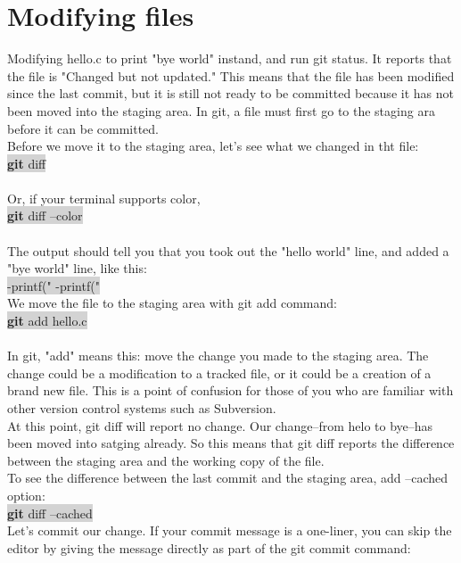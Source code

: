 \documentclass{article}
\begin{document}
 \section{\textbf{Modifying files}}
 Modifying hello.c to print "bye world" instand, and run git status. It reports that the file is "Changed but not updated." This means that the file has been modified since the last commit, but it is still not ready to be committed because it has not been moved into the staging area.
 In git, a file must first go to the staging ara before it can be committed.\\
 Before we move it to the staging area, let's see what we changed in tht file:\\
 \colorbox{lightgray}{
	 \textbf{git} diff\\
 }\\
 Or, if your terminal supports color,\\
 \colorbox{lightgray}{
	 \textbf{git} diff --color\\
 }\\
 The output should tell you that you took out the "hello world" line, and added a "bye world" line, like this:\\
 \colorbox{lightgray}{
	 -printf("%
	 -printf("%
 }\\
 We move the file to the staging area with git add command:\\
 \colorbox{lightgray}{
	 \textbf{git} add hello.c\\
 }\\
 In git, "add" means this: move the change you made to the staging area. The change could be a modification to a tracked file, or it could be a creation of a brand new file. This is a point of confusion for those of you who are familiar with other version control systems such as Subversion.\\
 At this point, git diff will report no change. Our change--from helo to bye--has been moved into satging already. So this means that git diff reports the difference between the staging area and the working copy of the file.\\
 To see the difference between the last commit and the staging area, add --cached option:\\
 \colorbox{lightgray}{
	 \textbf{git} diff --cached
 }\\
 Let's commit our change. If your commit message is a one-liner, you can skip the editor by giving the message directly as part of the git commit command:\\
\end{document}
